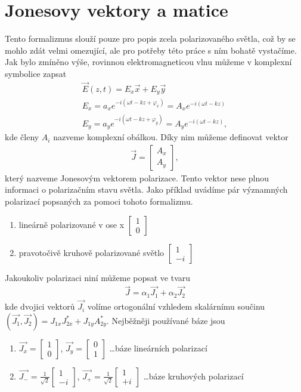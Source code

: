 \section{Jonesovy vektory a matice}
Tento formalizmus slouží pouze pro popis zcela polarizovaného světla, což by se mohlo zdát velmi omezující, ale pro potřeby této práce s ním bohatě vystačíme. Jak bylo zmíněno výše, rovinnou elektromagneticou vlnu můžeme v komplexní symbolice zapsat
\begin{eqnarray}
\vec{E}(z,t)=E_x\vec{x}+E_y\vec{y} \\
E_x=a_xe^{-i(\omega t-kz+\varphi_x)}=A_xe^{-i(\omega t-kz)}\\
E_y=a_ye^{-i(\omega t-kz+\varphi_y)}=A_ye^{-i(\omega t-kz)},
\end{eqnarray}
kde členy $A_i$ nazveme komplexní obálkou. Díky nim můžeme definovat vektor
\begin{eqnarray}
\vec{J}=\begin{bmatrix} A_x \\ A_y \end{bmatrix},
\end{eqnarray}
který nazveme Jonesovým vektorem polarizace. Tento vektor nese plnou informaci o polarizačním stavu světla. Jako příklad uvádíme pár významných polarizací popsaných za pomoci tohoto formalizmu.
\begin{enumerate}
\item lineárně polarizované v ose x $\begin{bmatrix} 1 \\ 0 \end{bmatrix}$
\item pravotočivě kruhově polarizované světlo $\begin{bmatrix} 1 \\ -i \end{bmatrix}$
\end{enumerate}
Jakoukoliv polarizaci niní můžeme popsat ve tvaru
\begin{eqnarray}
\vec{J}=\alpha_1\vec{J_1}+\alpha_2\vec{J_2}
\end{eqnarray}
kde dvojici vektorů $\vec{J_i}$ volíme ortogonální vzhledem skalárnímu součinu $(\vec{J_1},\vec{J_2})=J_{1x}J_{2x}^*+J_{1y}A_{2y}^*$. Nejběžněji používané  báze jsou
\begin{enumerate}
\item $\vec{J_x} = \begin{bmatrix} 1 \\ 0 \end{bmatrix}$, $\vec{J_y} = \begin{bmatrix} 0 \\ 1 \end{bmatrix}$ \dots báze lineárních polarizací
\item $\vec{J_-} =  \frac{1}{\sqrt{2}} \begin{bmatrix} 1 \\ -i \end{bmatrix}$, $\vec{J_+} = \frac{1}{\sqrt{2}} \begin{bmatrix} 1 \\ +i \end{bmatrix}$ \dots báze kruhových  polarizací
\end{enumerate}
